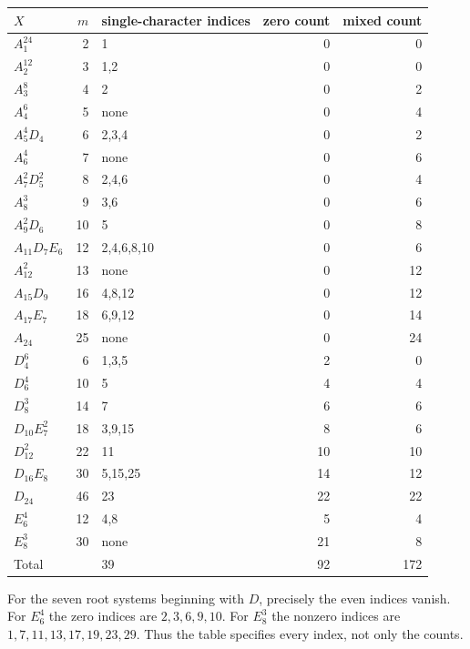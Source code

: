 \begin{center}
\small
\begin{tabular}{l r l r r}
$X$&$m$&single-character indices&zero count&mixed count\\\hline
$A_1^{24}$&2&1&0&0\\
$A_2^{12}$&3&1,2&0&0\\
$A_3^8$&4&2&0&2\\
$A_4^6$&5&none&0&4\\
$A_5^4D_4$&6&2,3,4&0&2\\
$A_6^4$&7&none&0&6\\
$A_7^2D_5^2$&8&2,4,6&0&4\\
$A_8^3$&9&3,6&0&6\\
$A_9^2D_6$&10&5&0&8\\
$A_{11}D_7E_6$&12&2,4,6,8,10&0&6\\
$A_{12}^2$&13&none&0&12\\
$A_{15}D_9$&16&4,8,12&0&12\\
$A_{17}E_7$&18&6,9,12&0&14\\
$A_{24}$&25&none&0&24\\
$D_4^6$&6&1,3,5&2&0\\
$D_6^4$&10&5&4&4\\
$D_8^3$&14&7&6&6\\
$D_{10}E_7^2$&18&3,9,15&8&6\\
$D_{12}^2$&22&11&10&10\\
$D_{16}E_8$&30&5,15,25&14&12\\
$D_{24}$&46&23&22&22\\
$E_6^4$&12&4,8&5&4\\
$E_8^3$&30&none&21&8\\\hline
Total&&39&92&172
\end{tabular}
\end{center}
For the seven root systems beginning with $D$, precisely the even indices
vanish.  For $E_6^4$ the zero indices are $2,3,6,9,10$.
For $E_8^3$ the nonzero indices are $1,7,11,13,17,19,23,29$.
Thus the table specifies every index, not only the counts.

